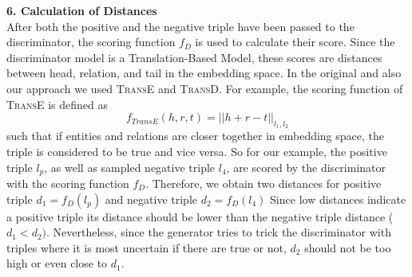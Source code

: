 \textbf{6. Calculation of Distances}\\
%
After both the positive and the negative triple have been passed to the discriminator, the scoring function $f_D$ is used to calculate their score.
Since the discriminator model is a Translation-Based Model, these scores are distances between head, relation, and tail in the embedding space.
In the original \kbgan and also our approach we used \textsc{TransE} and \textsc{TransD}.
For example, the scoring function of \textsc{TransE} is defined as 
\begin{equation}
    f_{TransE}(h,r,t) = || h + r - t ||_{l_1, l_2}
\end{equation}
such that if entities and relations are closer together in embedding space, the triple is considered to be true and vice versa.
So for our example, the positive triple $l_p$, as well as sampled negative triple $l_4$, are scored by the discriminator with the scoring function $f_D$.
Therefore, we obtain two distances for positive triple $d_1 = f_D(l_p)$ and negative triple $d_2 = f_D(l_4)$
Since low distances indicate a positive triple its distance should be lower than the negative triple distance ($d_1 < d_2)$.
Nevertheless, since the generator tries to trick the discriminator with triples where it is most uncertain if there are true or not, $d_2$ should not be too high or even close to $d_1$.






